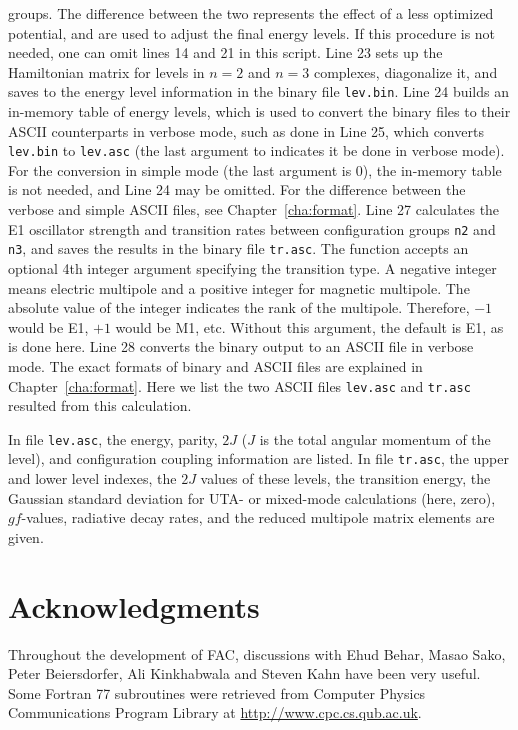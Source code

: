 groups. The difference between the two represents the effect of a less optimized
potential, and are used to adjust the final energy levels. If this procedure is
not needed, one can omit lines 14 and 21 in this script. Line 23 sets up the
Hamiltonian matrix for levels in $n = 2$ and $n = 3$ complexes, diagonalize it,
and saves to the energy level information in the binary file \verb|lev.bin|.
Line 24 builds an in-memory table of energy levels, which is used to convert the
binary files to their ASCII counterparts in verbose mode, such as done in Line
25, which converts \verb|lev.bin| to \verb|lev.asc| (the last argument to
 indicates it be done in verbose mode). For the conversion
in simple mode (the last argument is 0), the in-memory table is not needed, and
Line 24 may be omitted. For the difference between the verbose and simple ASCII
files, see Chapter~\ref{cha:format}. Line 27 calculates the E1 oscillator
strength and transition rates between configuration groups \verb|n2| and
\verb|n3|, and saves the results in the binary file \verb|tr.asc|. The function
 accepts an optional 4th integer argument specifying
the transition type. A negative integer means electric multipole and a positive
integer for magnetic multipole. The absolute value of the integer indicates the
rank of the multipole. Therefore, $-1$ would be E1, $+1$ would be M1, etc.
Without this argument, the default is E1, as is done here. Line 28 converts the
binary output to an ASCII file in verbose mode. The exact formats of binary and
ASCII files are explained in Chapter~\ref{cha:format}. Here we list the two
ASCII files \verb|lev.asc| and \verb|tr.asc| resulted from this calculation.

\lstset{numbers=none,basicstyle=\scriptsize,caption=demo/structure/lev.asc}

\lstset{numbers=none,basicstyle=\scriptsize,caption=demo/structure/tr.asc}

In file \verb|lev.asc|, the energy, parity, $2J$ ($J$ is the total angular
momentum of the level), and configuration coupling information are listed. In
file \verb|tr.asc|, the upper and lower level indexes, the $2J$ values of these
levels, the transition energy, the Gaussian standard deviation for UTA- or
mixed-mode calculations (here, zero), $gf$-values, radiative decay rates, and
the reduced multipole matrix elements are given.

\section{Acknowledgments}
Throughout the development of FAC, discussions with Ehud Behar, Masao
Sako, Peter Beiersdorfer, Ali Kinkhabwala and Steven Kahn have been very
useful. Some Fortran 77 subroutines were retrieved from Computer Physics
Communications Program Library at \url{http://www.cpc.cs.qub.ac.uk}.

